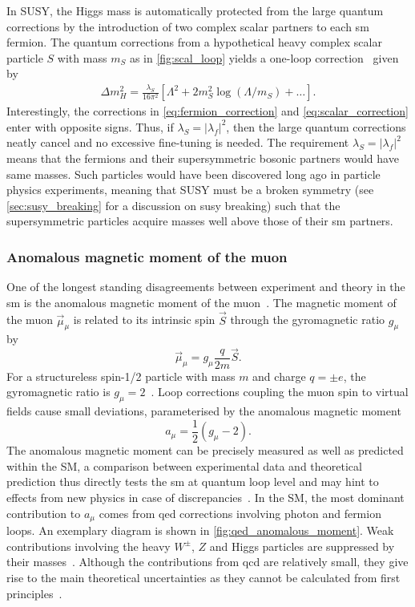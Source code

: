In SUSY, the Higgs mass is automatically protected from the large quantum corrections by the introduction of two complex scalar partners to each \gls{sm} fermion. The quantum corrections from a hypothetical heavy complex scalar particle $S$ with mass $m_S$ as in \cref{fig:scal_loop} yields a one-loop correction~\cite{Martin:1997ns} given by 
\begin{align}
	\Delta m_H^2 = \frac{\lambda_S}{16\pi^2}\left[\Lambda^2 + 2m_S^2\log\left(\Lambda/m_S\right)+ \dots\right].
	\label{eq:scalar_correction}
\end{align}
Interestingly, the corrections in \cref{eq:fermion_correction} and \cref{eq:scalar_correction} enter with opposite signs. Thus, if $\lambda_S = \vert\lambda_f\vert^2$, then the large quantum corrections neatly cancel and no excessive fine-tuning is needed. The requirement $\lambda_S = \vert\lambda_f\vert^2$ means that the fermions and their supersymmetric bosonic partners would have same masses. Such particles would have been discovered long ago in particle physics experiments, meaning that SUSY must be a broken symmetry (see \cref{sec:susy_breaking} for a discussion on \gls{susy} breaking) such that the supersymmetric particles acquire masses well above those of their \gls{sm} partners. 

\subsubsection{Anomalous magnetic moment of the muon}

One of the longest standing disagreements between experiment and theory in the \gls{sm} is the anomalous magnetic moment of the muon~\cite{pdg2020}. The magnetic moment of the muon $\vec{\mu}_\mu$ is related to its intrinsic spin $\vec{S}$ through the gyromagnetic ratio $g_\mu$ by
\begin{equation}
	\vec{\mu}_\mu = g_\mu \frac{q}{2m} \vec{S}.
\end{equation}
For a structureless spin-1/2 particle with mass $m$ and charge $q=\pm e$, the gyromagnetic ratio is $g_\mu = 2$~\cite{Bennett:2006fi}. Loop corrections coupling the muon spin to virtual fields cause small deviations, parameterised by the anomalous magnetic moment
\begin{equation}
	a_\mu = \frac{1}{2}(g_\mu-2).
\end{equation}
The anomalous magnetic moment can be precisely measured as well as predicted within the SM, a comparison between experimental data and theoretical prediction thus directly tests the \gls{sm} at quantum loop level and may hint to effects from new physics in case of discrepancies~\cite{baer_tata_2006}. In the SM, the most dominant contribution to $a_\mu$ comes from \gls{qed} corrections involving photon and fermion loops. An exemplary diagram is shown in \cref{fig:qed_anomalous_moment}. Weak contributions involving the heavy $W^\pm$, $Z$ and Higgs particles are suppressed by their masses~\cite{pdg2020}. Although the contributions from \gls{qcd} are relatively small, they give rise to the main theoretical uncertainties as they cannot be calculated from first principles~\cite{pdg2020}.

